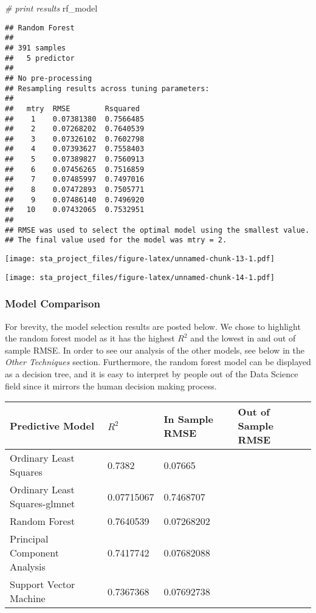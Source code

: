 \documentclass[
]{article}
\newenvironment{Shaded}{\begin{snugshade}}{\end{snugshade}}
\newcommand{\CommentTok}[1]{\textcolor[rgb]{0.56,0.35,0.01}{\textit{#1}}}
\newcommand{\NormalTok}[1]{#1}
\begin{document}
\begin{Shaded}
\begin{Highlighting}[]
\CommentTok{# print results}
\NormalTok{rf_model}
\end{Highlighting}
\end{Shaded}

\begin{verbatim}
## Random Forest 
## 
## 391 samples
##   5 predictor
## 
## No pre-processing
## Resampling results across tuning parameters:
## 
##   mtry  RMSE        Rsquared 
##    1    0.07381380  0.7566485
##    2    0.07268202  0.7640539
##    3    0.07326102  0.7602798
##    4    0.07393627  0.7558403
##    5    0.07389827  0.7560913
##    6    0.07456265  0.7516859
##    7    0.07485997  0.7497016
##    8    0.07472893  0.7505771
##    9    0.07486140  0.7496920
##   10    0.07432065  0.7532951
## 
## RMSE was used to select the optimal model using the smallest value.
## The final value used for the model was mtry = 2.
\end{verbatim}

\texttt{[image: sta\_project\_files/figure-latex/unnamed-chunk-13-1.pdf]}

\texttt{[image: sta\_project\_files/figure-latex/unnamed-chunk-14-1.pdf]}

\hypertarget{model-comparison}{%
\subsubsection{Model Comparison}\label{model-comparison}}

For brevity, the model selection results are posted below. We chose to
highlight the random forest model as it has the highest \(R^2\) and the
lowest in and out of sample RMSE. In order to see our analysis of the
other models, see below in the \emph{Other Techniques} section.
Furthermore, the random forest model can be displayed as a decision
tree, and it is easy to interpret by people out of the Data Science
field since it mirrors the human decision making process.

\begin{longtable}[]{@{}llll@{}}
\toprule
Predictive Model & \(R^2\) & In Sample RMSE & Out of Sample
RMSE\tabularnewline
\midrule
\endhead
Ordinary Least Squares & 0.7382 & 0.07665 &\tabularnewline
Ordinary Least Squares-glmnet & 0.07715067 & 0.7468707 &\tabularnewline
Random Forest & 0.7640539 & 0.07268202 &\tabularnewline
Principal Component Analysis & 0.7417742 & 0.07682088 &\tabularnewline
Support Vector Machine & 0.7367368 & 0.07692738 &\tabularnewline
\bottomrule
\end{longtable}
\end{document}
